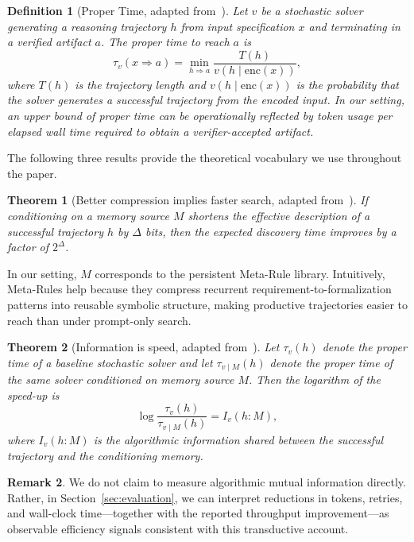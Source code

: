 \documentclass[conference]{IEEEtran}
\newtheorem{definition}{Definition}
\newtheorem{theorem}{Theorem}
\begin{document}
\begin{definition}[Proper Time, adapted from~\cite{e28030332}]
Let $v$ be a stochastic solver generating a reasoning trajectory $h$ from input specification $x$ and terminating in a verified artifact $a$. The \emph{proper time} to reach $a$ is
\begin{equation}
\tau_v(x \Rightarrow a)
=
\min_{h \Rightarrow a}
\frac{T(h)}{v(h \mid \mathrm{enc}(x))},
\label{eq:proper-time}
\end{equation}
where $T(h)$ is the trajectory length and $v(h \mid \mathrm{enc}(x))$ is the probability that the solver generates a successful trajectory from the encoded input. In our setting, an upper bound of proper time can be operationally reflected by token usage per elapsed wall time required to obtain a verifier-accepted artifact.
\end{definition}

The following three results provide the theoretical vocabulary we use throughout the paper.

\begin{theorem}[Better compression implies faster search, adapted from~\cite{e28030332}]
If conditioning on a memory source $M$ shortens the effective description of a successful trajectory $h$ by $\Delta$ bits, then the expected discovery time improves by a factor of $2^{\Delta}$.
\end{theorem}

In our setting, $M$ corresponds to the persistent Meta-Rule library. Intuitively, Meta-Rules help because they compress recurrent requirement-to-formalization patterns into reusable symbolic structure, making productive trajectories easier to reach than under prompt-only search.

\begin{theorem}[Information is speed, adapted from~\cite{e28030332}]
Let $\tau_v(h)$ denote the proper time of a baseline stochastic solver and let $\tau_{v \mid M}(h)$ denote the proper time of the same solver conditioned on memory source $M$. Then the logarithm of the speed-up is
\begin{equation}
\log \frac{\tau_v(h)}{\tau_{v \mid M}(h)}
=
I_v(h : M),
\label{eq:info-speed}
\end{equation}
where $I_v(h : M)$ is the algorithmic information shared between the successful trajectory and the conditioning memory.
\end{theorem}

\textbf{Remark 2}. We do not claim to measure algorithmic mutual information directly. Rather, in Section~\ref{sec:evaluation}, we can interpret reductions in tokens, retries, and wall-clock time---together with the reported throughput improvement---as observable efficiency signals consistent with this transductive account.
\end{document}
